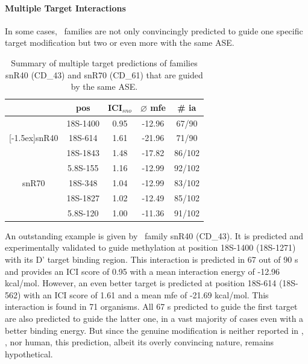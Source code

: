\paragraph{\textbf{Multiple Target Interactions}}
In some cases, \sno\ families are not only convincingly predicted to
guide one specific target modification but two or even more with the
same ASE.
\begin{table}
  \caption{Summary of multiple target predictions of families 
    snR40 (CD\_43) and snR70 (CD\_61) that are guided by the same ASE.}
  \label{tab:redundant_predictions}
  \begin{center}
    \begin{footnotesize}
      \begin{tabular}{c|c|c|c|c}
        &pos&ICI$_{sno}$&$\varnothing$
          mfe&\# ia\\
        \hline
        &18S-1400&0.95&-12.96&67/90\\
        \raisebox{1.5ex}[-1.5ex]{snR40}&18S-614&1.61&-21.96&71/90\\
        \hline
        &18S-1843&1.48&-17.82&86/102\\
        &5.8S-155&1.16&-12.99&92/102\\
        snR70&18S-348&1.04&-12.99&83/102\\
        &18S-1827&1.02&-12.49&85/102\\
        &5.8S-120&1.00&-11.36&91/102\\
      \end{tabular}
    \end{footnotesize}
  \end{center}
\end{table}
An outstanding example is given by \cd\ family snR40 (CD\_43). It is
predicted and experimentally validated \cite{Lowe:1999} to guide
methylation at position 18S-1400 (18S-1271) with its D' target binding
region. This interaction is predicted in 67 out of 90 \sno s and
provides an ICI score of 0.95 with a mean interaction energy of -12.96
kcal/mol. However, an even better target is predicted at position
18S-614 (18S-562) with an ICI score of 1.61 and a mean mfe of
-21.69 kcal/mol. This interaction is found in 71 organisms. All 67 \sno s
predicted to guide the first target are also predicted to guide the
latter one, in a vast majority of cases even with a better binding
energy. But since the genuine modification is neither reported in
\sce, \ncr, nor human, this prediction, albeit its overly convincing
nature, remains hypothetical.

